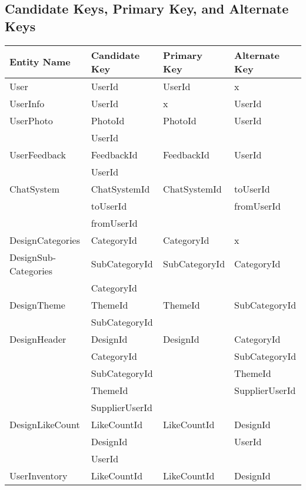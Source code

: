 \subsection{Candidate Keys, Primary Key, and Alternate Keys}
	\begin{longtable}{| p{3cm} | p{3.2cm} | l | p{3.2cm} |}
		\hline
		Entity Name & Candidate Key & Primary Key & Alternate Key \\
		\hline
		User 						& UserId 				& UserId 				& x 					\\ \hline
		UserInfo 					& UserId 				& x 					& UserId 				\\ \hline
		UserPhoto 					& PhotoId 				& PhotoId 				& UserId 				\\
					 				& UserId				& 						&						\\ \hline
		UserFeedback				& FeedbackId			& FeedbackId			& UserId				\\
									& UserId				& 						&						\\ \hline
		ChatSystem					& ChatSystemId			& ChatSystemId			& toUserId				\\
									& toUserId				&						& fromUserId			\\
									& fromUserId			&						&						\\ \hline
		DesignCategories			& CategoryId			& CategoryId			& x						\\ \hline
		DesignSub-Categories			& SubCategoryId			& SubCategoryId			& CategoryId			\\
									& CategoryId			&						& 						\\ \hline
		DesignTheme					& ThemeId				& ThemeId				& SubCategoryId			\\
									& SubCategoryId			&						&						\\ \hline
		DesignHeader				& DesignId				& DesignId				& CategoryId			\\
									& CategoryId			&						& SubCategoryId			\\
									& SubCategoryId 		&						& ThemeId				\\
									& ThemeId				&						& SupplierUserId		\\
									& SupplierUserId		&						& 						\\ \hline
		DesignLikeCount				& LikeCountId			& LikeCountId			& DesignId				\\
									& DesignId				& 						& UserId				\\
									& UserId				& 						& 						\\ \hline
		UserInventory				& LikeCountId			& LikeCountId			& DesignId				\\

\end{longtable}
